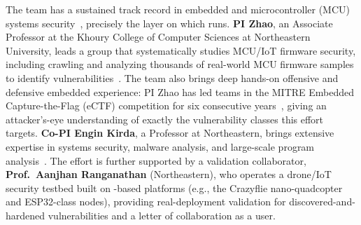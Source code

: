 The team has a sustained track record in embedded and microcontroller (MCU) systems security~\cite{tan24sok, nino24firware, ma2023dac, zhao24tee}, precisely the layer on which \ose{} runs.
\textbf{PI Zhao}, an Associate Professor at the Khoury College of Computer Sciences at Northeastern University, leads a group that systematically studies MCU/IoT firmware security, including crawling and analyzing thousands of real-world MCU firmware samples to identify vulnerabilities~\cite{nino24firware}.
The team also brings deep hands-on offensive and defensive embedded experience: PI Zhao has led teams in the MITRE Embedded Capture-the-Flag (eCTF) competition for six consecutive years~, giving an attacker's-eye understanding of exactly the vulnerability classes this effort targets.
\textbf{Co-PI Engin Kirda}, a Professor at Northeastern, brings extensive expertise in systems security, malware analysis, and large-scale program analysis~.
The effort is further supported by a validation collaborator, \textbf{Prof.\ Aanjhan Ranganathan} (Northeastern), who operates a drone/IoT security testbed built on \ose-based platforms (e.g., the Crazyflie nano-quadcopter and ESP32-class nodes), providing real-deployment validation for discovered-and-hardened vulnerabilities and a letter of collaboration as a \ose{} user.
